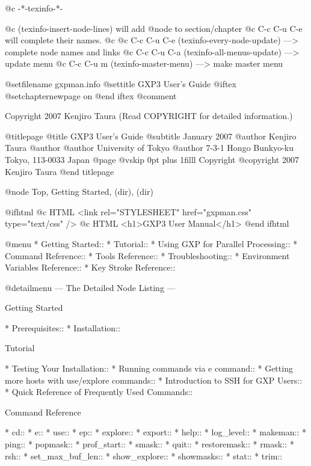   @c -*-texinfo-*-

@c (texinfo-insert-node-lines) will add @node to section/chapter
@c C-c C-u C-e will complete their names.
@c 
@c C-c C-u C-e  (texinfo-every-node-update) ---> complete node names and links
@c C-c C-u C-a  (texinfo-all-menus-update)  ---> update menu
@c C-c C-u m    (texinfo-master-menu)       ---> make master menu

@setfilename gxpman.info
@settitle GXP3 User's Guide
@iftex
@setchapternewpage on
@end iftex
@comment %


Copyright 2007 Kenjiro Taura (Read COPYRIGHT for detailed information.)


@titlepage
@title GXP3 User's Guide
@subtitle January 2007
@author Kenjiro Taura
@author
@author University of Tokyo
@author 7-3-1 Hongo Bunkyo-ku Tokyo, 113-0033 Japan
@page
@vskip 0pt plus 1filll
Copyright @copyright{} 2007 Kenjiro Taura
@end titlepage

@node Top, Getting Started, (dir), (dir)

@ifhtml
@c HTML <link rel="STYLESHEET" href="gxpman.css" type="text/css" />
@c HTML <h1>GXP3 User Manual</h1>
@end ifhtml

@menu
* Getting Started::             
* Tutorial::                    
* Using GXP for Parallel Processing::  
* Command Reference::           
* Tools Reference::             
* Troubleshooting::             
* Environment Variables Reference::  
* Key Stroke Reference::        

@detailmenu
 --- The Detailed Node Listing ---

Getting Started

* Prerequisites::               
* Installation::                

Tutorial

* Testing Your Installation::   
* Running commands via e command::  
* Getting more hosts with use/explore commands::  
* Introduction to SSH for GXP Users::  
* Quick Reference of Frequently Used Commands::  

Command Reference

* cd::                          
* e::                           
* use::                         
* ep::                          
* explore::                     
* export::                      
* help::                        
* log_level::                   
* makeman::                     
* ping::                        
* popmask::                     
* prof_start::                  
* smask::                       
* quit::                        
* restoremask::                 
* rmask::                       
* rsh::                         
* set_max_buf_len::             
* show_explore::                
* showmasks::                   
* stat::                        
* trim::                        

